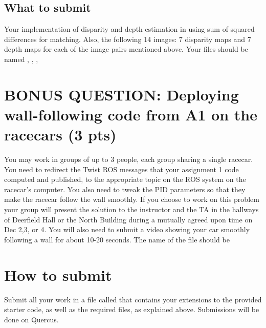 \documentclass[11pt, a4paper]{article}
\begin{document}
\subsection*{What to submit}
Your implementation of disparity and depth estimation in  using sum of squared differences for matching. Also, the following 14 images: 
7 disparity maps and 7 depth maps for each of the image pairs mentioned above. Your files should be named , , , 

\section{BONUS QUESTION: Deploying wall-following code from A1 on the racecars (3 pts)}
You may work in groups of up to 3 people, each group sharing a single racecar. You need to redirect the Twist ROS messages that your assignment 1 code computed and published, to the appropriate  topic on the ROS system on the racecar's computer. You also need to tweak the PID parameters so that they make the racecar follow the wall smoothly. If you choose to work on this problem your group will present the solution to the instructor and the TA in the hallways of Deerfield Hall or the North Building during a mutually agreed upon time on Dec 2,3, or 4. You will also need to submit a video showing your car smoothly following a wall for about 10-20 seconds. The name of the file should be   



\section{How to submit}
Submit all your work in a file called  that contains your extensions to the provided starter code, as well as the required files, as explained above. Submissions will be done on Quercus. 

\end{document}
